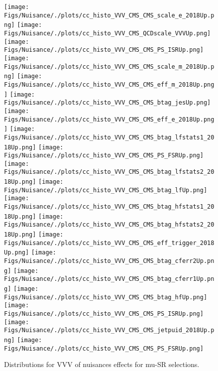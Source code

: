 \begin{figure*}[htbp]  
\centering 
\texttt{[image: Figs/Nuisance/./plots/cc\_histo\_VVV\_CMS\_CMS\_scale\_e\_2018Up.png]}
\texttt{[image: Figs/Nuisance/./plots/cc\_histo\_VVV\_CMS\_QCDscale\_VVVUp.png]}
\texttt{[image: Figs/Nuisance/./plots/cc\_histo\_VVV\_CMS\_CMS\_PS\_ISRUp.png]}
\texttt{[image: Figs/Nuisance/./plots/cc\_histo\_VVV\_CMS\_CMS\_scale\_m\_2018Up.png]}
\texttt{[image: Figs/Nuisance/./plots/cc\_histo\_VVV\_CMS\_CMS\_eff\_m\_2018Up.png]}
\texttt{[image: Figs/Nuisance/./plots/cc\_histo\_VVV\_CMS\_CMS\_btag\_jesUp.png]}
\texttt{[image: Figs/Nuisance/./plots/cc\_histo\_VVV\_CMS\_CMS\_eff\_e\_2018Up.png]}
\texttt{[image: Figs/Nuisance/./plots/cc\_histo\_VVV\_CMS\_CMS\_btag\_lfstats1\_2018Up.png]}
\texttt{[image: Figs/Nuisance/./plots/cc\_histo\_VVV\_CMS\_CMS\_PS\_FSRUp.png]}\\
\texttt{[image: Figs/Nuisance/./plots/cc\_histo\_VVV\_CMS\_CMS\_btag\_lfstats2\_2018Up.png]}
\texttt{[image: Figs/Nuisance/./plots/cc\_histo\_VVV\_CMS\_CMS\_btag\_lfUp.png]}
\texttt{[image: Figs/Nuisance/./plots/cc\_histo\_VVV\_CMS\_CMS\_btag\_hfstats1\_2018Up.png]}
\texttt{[image: Figs/Nuisance/./plots/cc\_histo\_VVV\_CMS\_CMS\_btag\_hfstats2\_2018Up.png]}
\texttt{[image: Figs/Nuisance/./plots/cc\_histo\_VVV\_CMS\_CMS\_eff\_trigger\_2018Up.png]}
\texttt{[image: Figs/Nuisance/./plots/cc\_histo\_VVV\_CMS\_CMS\_btag\_cferr2Up.png]}
\texttt{[image: Figs/Nuisance/./plots/cc\_histo\_VVV\_CMS\_CMS\_btag\_cferr1Up.png]}
\texttt{[image: Figs/Nuisance/./plots/cc\_histo\_VVV\_CMS\_CMS\_btag\_hfUp.png]}
\texttt{[image: Figs/Nuisance/./plots/cc\_histo\_VVV\_CMS\_CMS\_PS\_ISRUp.png]}\\
\texttt{[image: Figs/Nuisance/./plots/cc\_histo\_VVV\_CMS\_CMS\_jetpuid\_2018Up.png]}
\texttt{[image: Figs/Nuisance/./plots/cc\_histo\_VVV\_CMS\_CMS\_PS\_FSRUp.png]}
\\ 
\caption{ 
   Distributions for VVV of nuisances effects for mu-SR selections.
} 
\label{fig:VVV_mu_SR} 
\end{figure*} 




